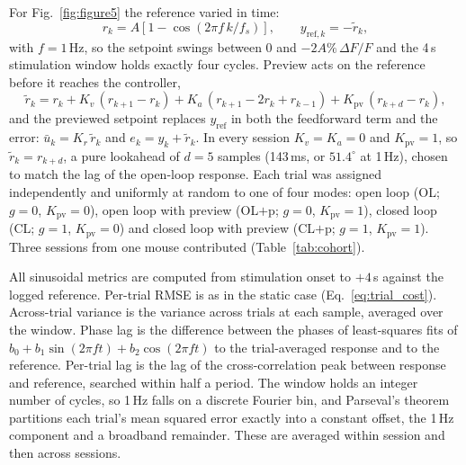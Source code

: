 For Fig.~\ref{fig:figure5} the reference varied in time:
%
\begin{equation}
    r_{k} = A\left[1 - \cos\!\left(2\pi f\,k / f_{s}\right)\right],
    \qquad y_{\mathrm{ref},k} = -\tilde{r}_{k},
    \label{eq:sine_ref}
\end{equation}
%
with $f = 1$\,Hz, so the setpoint swings between 0 and $-2A\%\,\Delta F/F$ and
the 4\,s stimulation window holds exactly four cycles. Preview acts on the
reference before it reaches the controller,
%
\begin{equation}
    \tilde{r}_{k} = r_{k} + K_{v}\,(r_{k+1} - r_{k})
                + K_{a}\,(r_{k+1} - 2r_{k} + r_{k-1})
                + K_{\mathrm{pv}}\,(r_{k+d} - r_{k}),
    \label{eq:preview}
\end{equation}
%
and the previewed setpoint replaces $y_{\mathrm{ref}}$ in both the feedforward
term and the error: $\bar{u}_{k} = K_{r}\,\tilde{r}_{k}$ and
$e_{k} = y_{k} + \tilde{r}_{k}$. In every session $K_{v} = K_{a} = 0$ and
$K_{\mathrm{pv}} = 1$, so $\tilde{r}_{k} = r_{k+d}$, a pure lookahead of
$d = 5$ samples (143\,ms, or $51.4^{\circ}$ at 1\,Hz), chosen to match the lag
of the open-loop response. Each trial was assigned independently and uniformly
at random to one of four modes: open loop (OL; $g = 0$, $K_{\mathrm{pv}} = 0$),
open loop with preview (OL$+$p; $g = 0$, $K_{\mathrm{pv}} = 1$), closed loop (CL;
$g = 1$, $K_{\mathrm{pv}} = 0$) and closed loop with preview (CL$+$p; $g = 1$,
$K_{\mathrm{pv}} = 1$). Three sessions from one mouse contributed
(Table~\ref{tab:cohort}).

All sinusoidal metrics are computed from stimulation onset to $+4$\,s against
the logged reference. Per-trial RMSE is as in the static case
(Eq.~\ref{eq:trial_cost}). Across-trial variance is the variance across trials
at each sample, averaged over the window. Phase lag is the difference between
the phases of least-squares fits of $b_{0} + b_{1}\sin(2\pi f t) + b_{2}\cos(2\pi
f t)$ to the trial-averaged response and to the reference. Per-trial lag is the
lag of the cross-correlation peak between response and reference, searched
within half a period. The window holds an integer number of cycles, so
1\,Hz falls on a discrete Fourier bin, and Parseval's theorem partitions each
trial's mean squared error exactly into a constant offset, the 1\,Hz component
and a broadband remainder. These are averaged within session and then across
sessions.

